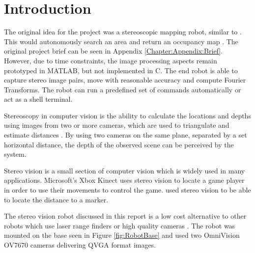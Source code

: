 \chapter{Introduction} \label{Chapter:Introduction}

%
%
%
%


The original idea for the project was a stereoscopic mapping robot, similar to \cite{Pirobot}. This would autonomously search an area and return an occupancy map \citep{thrun2003learning}. The original project brief can be seen in Appendix \ref{Chapter:Appendix:Brief}. However, due to time constraints, the image processing aspects remain prototyped in MATLAB, but not implemented in C. The end robot is able to capture stereo image pairs, move with reasonable accuracy and compute Fourier Transforms. The robot can run a predefined set of commands automatically or act as a shell terminal.

Stereoscopy in computer vision is the ability to calculate the locations and depths using images from two or more cameras, which are used to triangulate and estimate distances \citep{Saxena:DepthEstimation}. By using two cameras on the same plane, separated by a set horizontal distance, the depth of the observed scene can be perceived by the system.

Stereo vision is a small section of computer vision which is widely used in many applications. Microsoft's Xbox Kinect \citep{Microsoft:Kinect} uses stereo vision to locate a game player in order to use their movements to control the game. \cite{Mrovlje:Distance_Stereoscopic} used stereo vision to be able to locate the distance to a marker. 

The stereo vision robot discussed in this report is a low cost alternative to other robots which use laser range finders or high quality cameras \citep{Se:MappingRobot}. The robot was mounted on the base seen in Figure \ref{fig:RobotBase} and used two OmniVision OV7670 cameras delivering QVGA format images.

